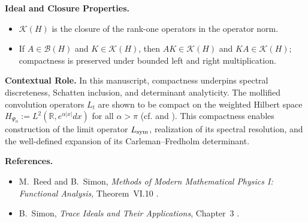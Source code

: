 \begin{definition}
\medskip
\noindent\textbf{Ideal and Closure Properties.}
\begin{itemize}
    \item \( \mathcal{K}(H) \) is the closure of the rank-one operators in the operator norm.
    \item If \( A \in \mathcal{B}(H) \) and \( K \in \mathcal{K}(H) \), then \( AK \in \mathcal{K}(H) \) and \( KA \in \mathcal{K}(H) \); compactness is preserved under bounded left and right multiplication.
\end{itemize}

\medskip
\noindent\textbf{Contextual Role.}
In this manuscript, compactness underpins spectral discreteness, Schatten inclusion, and determinant analyticity. The mollified convolution operators \( L_t \) are shown to be compact on the weighted Hilbert space \( H_{\Psi_\alpha} := L^2(\mathbb{R}, e^{\alpha|x|} dx) \) for all \( \alpha > \pi \) (cf.  and ). This compactness enables construction of the limit operator \( L_{\mathrm{sym}} \), realization of its spectral resolution, and the well-defined expansion of its Carleman--Fredholm determinant.

\medskip
\noindent\textbf{References.}
\begin{itemize}
    \item M.~Reed and B.~Simon, \emph{Methods of Modern Mathematical Physics I: Functional Analysis}, Theorem~VI.10 \cite{ReedSimon1980I}.
    \item B.~Simon, \emph{Trace Ideals and Their Applications}, Chapter~3 \cite{Simon2005TraceIdeals}.
\end{itemize}
\end{definition}

